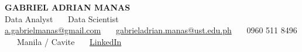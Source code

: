 \documentclass[10pt,letterpaper]{article}
\begin{document}
\begin{center}
  {\fontsize{22}{24}\selectfont\bfseries GABRIEL ADRIAN MANAS}\\[3pt]
  {\large\color{accent} Data Analyst \ \textbar\ \ Data Scientist}\\[5pt]
  {\small
    \href{mailto:a.gabrielmanas@gmail.com}{a.gabrielmanas@gmail.com}
    \ \textbar\ \ \href{mailto:gabrieladrian.manas@ust.edu.ph}{gabrieladrian.manas@ust.edu.ph}
    \ \textbar\ \ 0960 511 8496
    \ \textbar\ \ Manila / Cavite
    \ \textbar\ \ \href{https://linkedin.com/in/gabrielmanas}{LinkedIn}
  }
\end{center}
\vspace{2pt}

\noindent
\end{document}
